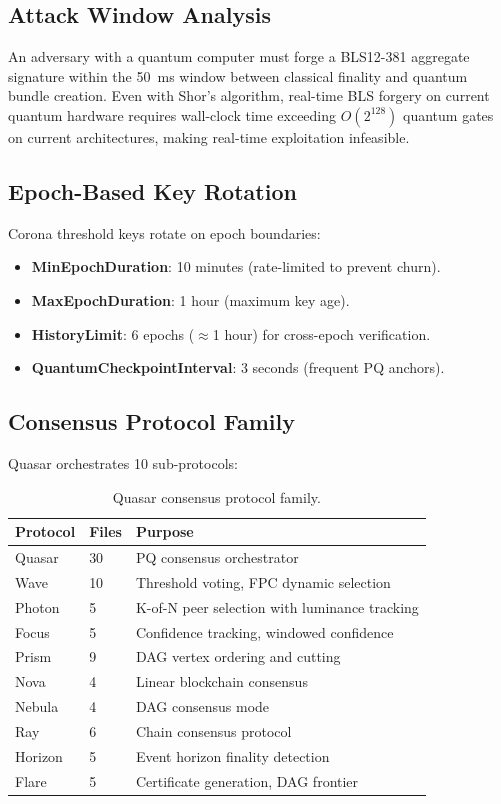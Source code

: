 \documentclass[11pt,letterpaper]{article}
\begin{document}
\subsection{Attack Window Analysis}

\begin{theorem}
An adversary with a quantum computer must forge a BLS12-381 aggregate signature within the 50~ms window between classical finality and quantum bundle creation. Even with Shor's algorithm, real-time BLS forgery on current quantum hardware requires wall-clock time exceeding $O(2^{128})$ quantum gates on current architectures, making real-time exploitation infeasible.
\end{theorem}

\subsection{Epoch-Based Key Rotation}

Corona threshold keys rotate on epoch boundaries:
\begin{itemize}
\item \textbf{MinEpochDuration}: 10 minutes (rate-limited to prevent churn).
\item \textbf{MaxEpochDuration}: 1 hour (maximum key age).
\item \textbf{HistoryLimit}: 6 epochs ($\approx$1 hour) for cross-epoch verification.
\item \textbf{QuantumCheckpointInterval}: 3 seconds (frequent PQ anchors).
\end{itemize}

\subsection{Consensus Protocol Family}

Quasar orchestrates 10 sub-protocols:

\begin{table}[H]
\centering
\small
\begin{tabular}{@{}llp{5.5cm}@{}}
\toprule
\textbf{Protocol} & \textbf{Files} & \textbf{Purpose} \\
\midrule
Quasar & 30 & PQ consensus orchestrator \\
Wave & 10 & Threshold voting, FPC dynamic selection \\
Photon & 5 & K-of-N peer selection with luminance tracking \\
Focus & 5 & Confidence tracking, windowed confidence \\
Prism & 9 & DAG vertex ordering and cutting \\
Nova & 4 & Linear blockchain consensus \\
Nebula & 4 & DAG consensus mode \\
Ray & 6 & Chain consensus protocol \\
Horizon & 5 & Event horizon finality detection \\
Flare & 5 & Certificate generation, DAG frontier \\
\bottomrule
\end{tabular}
\caption{Quasar consensus protocol family.}
\label{tab:consensus-protocols}
\end{table}
\end{document}
